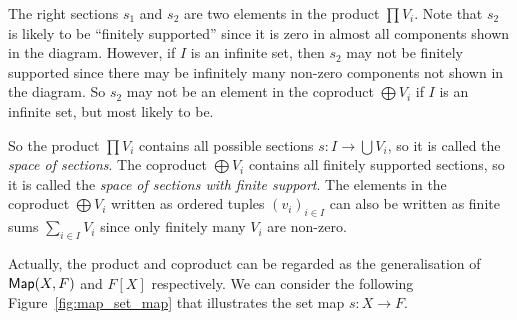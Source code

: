 \begin{remark}
  The right sections $s_1$ and $s_2$ are two elements in the product $\prod V_i$. Note that $s_2$ is likely to be ``finitely supported'' since it is zero in almost all components shown in the diagram. However, if $I$ is an infinite set, then $s_2$ may not be finitely supported since there may be infinitely many non-zero components not shown in the diagram. So $s_2$ may not be an element in the coproduct $\bigoplus V_i$ if $I$ is an infinite set, but most likely to be.
\end{remark}

So the product $\prod V_i$ contains all possible sections $s \colon I \to \bigcup V_i$, so it is called the \emph{space of sections}. The coproduct $\bigoplus V_i$ contains all finitely supported sections, so it is called the \emph{space of sections with finite support}. The elements in the coproduct $\bigoplus V_i$ written as ordered tuples ${(v_i)}_{i \in I}$ can also be written as finite sums $\sum_{i \in I} V_i$ since only finitely many $V_i$ are non-zero.

Actually, the product and coproduct can be regarded as the generalisation of $\operatorname{\text{\normalfont\sffamily Map}}(X, F)$ and $F[X]$ respectively. We can consider the following Figure~\ref{fig:map_set_map} that illustrates the set map $s \colon X \to F$.

